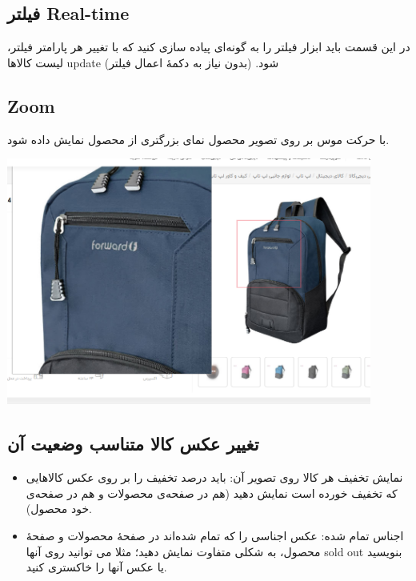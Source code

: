 \documentclass[]{article}
\begin{document}
\newpage


\subsection*{{\titr فیلتر Real-time   }}

در این قسمت باید ابزار فیلتر را به گونه‌ای پیاده سازی کنید که با تغییر هر پارامتر فیلتر، لیست کالاها update شود. (بدون نیاز به دکمهٔ اعمال فیلتر)


\subsection*{{\titr Zoom   }}

 با حرکت موس بر روی تصویر محصول نمای بزرگتری از محصول نمایش داده شود.
 
 
 
 \begin{center}
\includegraphics[width=0.9\textwidth]{images/image33.png}
\end{center}
 
 
 
\subsection*{{\titr تغییر عکس کالا متناسب وضعیت آن   }}


\begin{itemize}

\item

نمایش تخفیف هر کالا روی تصویر آن: باید درصد تخفیف را بر روی عکس کالاهایی که تخفیف خورده است نمایش دهید (هم در صفحه‌ی محصولات و هم در صفحه‌ی خود محصول).

\item

اجناس تمام شده: عکس اجناسی را که تمام شده‌اند در صفحهٔ محصولات و صفحهٔ محصول، به شکلی متفاوت نمایش دهید؛ مثلا می توانید روی آنها sold out  بنویسید یا عکس آنها را خاکستری کنید.


\end{itemize}
\end{document}
